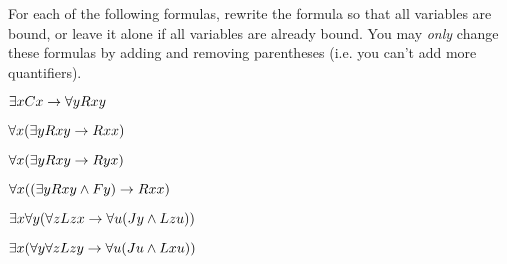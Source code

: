 \problempart
For each of the following formulas, rewrite the formula so that all variables are bound, or leave it alone if all variables are already bound.  You may \emph{only} change these formulas by adding and removing parentheses (i.e. you can't add more quantifiers).

\begin{earg}
\item $\exists xCx \rightarrow \forall yRxy$
\item $\forall x(\exists yRxy \rightarrow Rxx)$
\item $\forall x(\exists yRxy \rightarrow Ryx)$
\item $\forall x((\exists yRxy \wedge Fy) \rightarrow Rxx)$
\item $\exists x\forall y(\forall zLzx \rightarrow \forall u(Jy \wedge Lzu))$
\item $\exists x(\forall y \forall zLzy \rightarrow \forall u(Ju \wedge Lxu))$
\end{earg}

